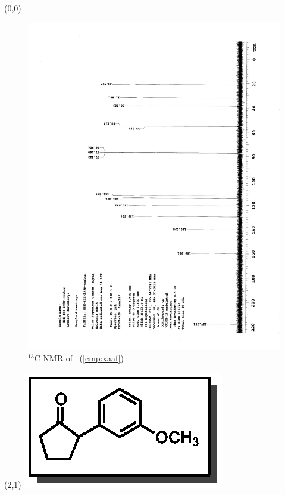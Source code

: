 \clearpage
\begin{textblock}{20}(0,0)
\begin{figure}[htb]
\caption{$^{13}$C NMR of  \CMPxaaf\ (\ref{cmp:xaaf})}
\includegraphics[scale=0.75, trim = 0mm 0mm 0mm 5mm,
clip]{chp_asymmetric/images/nmr/xaafC}
\vspace{-100pt}
\end{figure}
\end{textblock}
\begin{textblock}{1}(2,1)
\includegraphics[scale=0.8, angle=90]{chp_asymmetric/images/xaaf}
\end{textblock}
\clearpage

